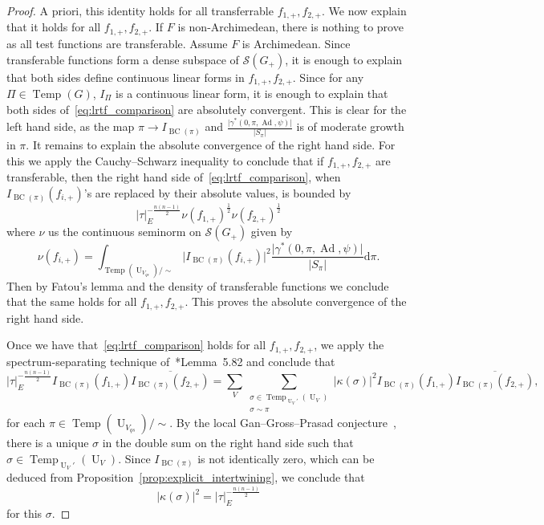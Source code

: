 \documentclass[letterpaper,11pt]{amsart}
\newcommand{\cS}{\mathcal{S}}
\newcommand{\rd}{\mathrm{d}}
\newcommand{\<}{\negthickspace}
\providecommand{\abs}[1]{\lvert#1\rvert}
\DeclareMathOperator{\U}{U}
\DeclareMathOperator{\BC}{BC}
\DeclareMathOperator{\Ad}{Ad}
\DeclareMathOperator{\Temp}{Temp} \DeclareMathOperator{\temp}{temp}
\theoremstyle{definition}
\theoremstyle{plain}
\theoremstyle{remark}
\numberwithin{equation}{section}
\begin{document}
\begin{proof}
A priori, this identity holds for all transferrable
$f_{1, +}, f_{2, +}$. We now explain that it holds for all $f_{1, +}, f_{2,
+}$. If $F$ is non-Archimedean, there is nothing to prove as all test
functions are transferable. Assume $F$ is Archimedean. Since transferable
functions form a dense subspace of $\cS(G_+)$, it is enough to explain that
both sides define continuous linear forms in $f_{1, +}, f_{2, +}$. Since for
any $\Pi \in \Temp(G)$, $I_{\Pi}$ is a continuous linear form, it is enough
to explain that both sides of~\eqref{eq:lrtf_comparison} are absolutely
convergent. This is clear for the left hand side, as the map $\pi \to
I_{\BC(\pi)}$ and $\frac{\abs{\gamma^*(0,\pi, \Ad, \psi)}}{\abs{S_{\pi}}}$ is of
moderate growth in $\pi$. It remains to explain the absolute convergence of
the right hand side. For this we apply the Cauchy--Schwarz inequality to
conclude that if $f_{1, +}, f_{2, +}$ are transferable, then the right hand
side of~\eqref{eq:lrtf_comparison}, when $I_{\BC(\pi)}(f_{i, +})$'s are
replaced by their absolute values, is bounded by
    \[
    \abs{\tau}_E^{-\frac{n(n-1)}{2}}
    \nu(f_{1, +})^{\frac{1}{2}} \nu(f_{2, +})^{\frac{1}{2}}
    \]
where $\nu$ us the continuous seminorm on $\cS(G_+)$ given by
    \[
    \nu(f_{i, +}) =
    \int_{\Temp(\U_{V_{qs}})/\sim} \abs{I_{\BC(\pi)}(f_{i, +})}^2
    \frac{\abs{\gamma^*(0,\pi, \Ad, \psi)}}{\abs{S_{\pi}}} \rd \pi.
    \]
Then by Fatou's lemma and the density of transferable functions we conclude
that the same holds for all $f_{1, +}, f_{2, +}$. This proves the absolute
convergence of the right hand side.

Once we have that~\eqref{eq:lrtf_comparison} holds for all $f_{1, +}, f_{2,
+}$, we apply the spectrum-separating technique of~\cite{BP1}*{Lemma~5.82} and
conclude that
    \[
    \abs{\tau}_E^{-\frac{n(n-1)}{2}}
    I_{\BC(\pi)}(f_{1, +})
    \overline{I_{\BC(\pi)}(f_{2, +})} =
    \sum_V
    \sum_{\substack{\sigma \in \Temp_{\U_V'}(\U_V)\\
    \sigma \sim \pi}} \abs{\kappa(\sigma)}^2
    I_{\BC(\pi)}(f_{1, +})
    \overline{I_{\BC(\pi)}(f_{2, +})},
    \]
for each $\pi \in \Temp(\U_{V_{qs}})/\sim$. By the local Gan--Gross--Prasad
conjecture~\cites{GI2,Xue6}, there is a unique $\sigma$ in the double sum on
the right hand side such that $\sigma \in \Temp_{\U_V'}(\U_V)$. Since
$I_{\BC(\pi)}$ is not identically zero, which can be deduced from
Proposition~\ref{prop:explicit_intertwining}, we conclude that
    \[
    \abs{\kappa(\sigma)}^2 = \abs{\tau}_E^{-\frac{n(n-1)}{2}}
    \]
for this $\sigma$.
\end{proof}
\end{document}
